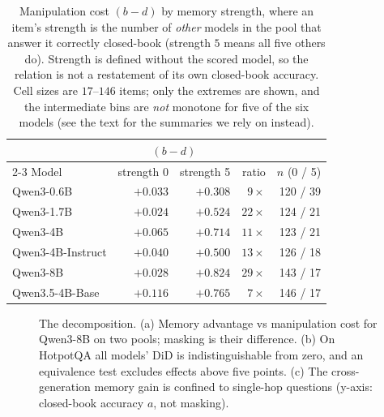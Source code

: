 \documentclass[11pt]{article}
\begin{document}
\begin{table}[t]\centering\small
\caption{Manipulation cost $(b-d)$ by memory strength, where an item's strength is the number
of \emph{other} models in the pool that answer it correctly closed-book (strength $5$ means
all five others do). Strength is defined without the scored model, so the relation is not a
restatement of its own closed-book accuracy. Cell sizes are $17$--$146$ items; only the
extremes are shown, and the intermediate bins are \emph{not} monotone for five of the six
models (see the text for the summaries we rely on instead).}
\label{tab:strength}
\begin{tabular}{lrrrr}
\toprule
 & \multicolumn{2}{c}{$(b-d)$} & & \\
\cmidrule(lr){2-3}
Model & strength 0 & strength 5 & ratio & $n$ (0 / 5) \\
\midrule
Qwen3-0.6B     & $+0.033$ & $+0.308$ & $9\times$  & 120 / 39 \\
Qwen3-1.7B     & $+0.024$ & $+0.524$ & $22\times$ & 124 / 21 \\
Qwen3-4B       & $+0.065$ & $+0.714$ & $11\times$ & 123 / 21 \\
Qwen3-4B-Instruct & $+0.040$ & $+0.500$ & $13\times$ & 126 / 18 \\
Qwen3-8B       & $+0.028$ & $+0.824$ & $29\times$ & 143 / 17 \\
Qwen3.5-4B-Base & $+0.116$ & $+0.765$ & $7\times$  & 146 / 17 \\
\bottomrule
\end{tabular}
\end{table}

\begin{figure}[t]\centering
\caption{The decomposition. (a) Memory advantage vs manipulation cost for Qwen3-8B on two
pools; masking is their difference. (b) On HotpotQA all models' DiD is indistinguishable
from zero, and an equivalence test excludes effects above five points. (c) The
cross-generation memory gain is confined to single-hop questions (y-axis: closed-book
accuracy $a$, not masking).}
\label{fig:precond}
\end{figure}
\end{document}
